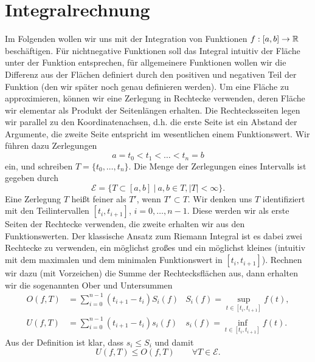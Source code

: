 \chapter{Integralrechnung}
\label{\detokenize{integration/integration:integralrechnung}}\label{\detokenize{integration/integration::doc}}
Im Folgenden wollen wir uns mit der Integration von Funktionen \(f:[a,b] \rightarrow \mathbb{R}\) beschäftigen. Für nichtnegative Funktionen soll das Integral intuitiv der Fläche unter der Funktion entsprechen, für allgemeinere Funktionen wollen wir die Differenz aus der Flächen definiert durch den positiven und negativen Teil der Funktion (den wir später noch genau definieren werden).  Um eine Fläche zu approximieren, können wir eine Zerlegung in Rechtecke verwenden, deren Fläche wir elementar als Produkt der Seitenlängen erhalten. Die Rechtecksseiten legen wir parallel zu den Koordinatenachsen, d.h. die erste Seite ist ein Abstand der Argumente, die zweite Seite entspricht im wesentlichen einem Funktionswert.
Wir führen dazu Zerlegungen
\begin{equation*}
 a = t_0 < t_1 < \ldots < t_n = b
\end{equation*}
ein, und schreiben \(T=\{t_0,\ldots,t_n\}\). Die Menge der Zerlegungen eines Intervalls ist gegeben durch
\begin{equation*}
 {\mathcal E} = \{ T \subset [a,b]~|~ a,b \in T, \vert T \vert < \infty\}.
\end{equation*}
Eine Zerlegung \(T\) heißt feiner als \(T'\), wenn \(T' \subset T\). Wir denken uns \(T\) identifiziert mit den Teilintervallen \([t_i,t_{i+1}]\), \(i=0,\ldots,n-1\). Diese werden wir als erste Seiten der Rechtecke verwenden, die zweite erhalten wir aus den Funktionswerten. Der klassische Ansatz zum Riemann Integral ist es dabei zwei Rechtecke zu verwenden, ein möglichst großes und ein möglichst kleines (intuitiv mit dem maximalen und dem minimalen Funktionswert in \([t_i,t_{i+1}]\)). Rechnen wir dazu (mit Vorzeichen) die Summe der Rechtecksflächen aus, dann erhalten wir die sogenannten Ober  und Untersummen
\begin{align*}
O(f,T) &= \sum_{i=0}^{n-1} (t_{i+1} - t_i) S_i(f) &S_i(f) =  \sup_{t \in  [t_i,t_{i+1}]} f(t), \\
U(f,T) &= \sum_{i=0}^{n-1} (t_{i+1} - t_i) s_i(f) &s_i(f) =  \inf_{t \in  [t_i,t_{i+1}]} f(t).
\end{align*}
Aus der Definition ist klar, dass \(s_i \leq S_i\) und damit
\begin{equation*}
 U(f,T) \leq O(f,T) \qquad \forall T \in {\mathcal E}.
\end{equation*}
